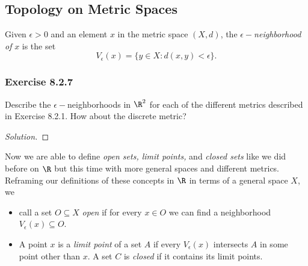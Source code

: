 \subsection{Topology on Metric Spaces}

\begin{tcolorbox}
\begin{defn}
    Given \( \epsilon > 0  \) and an element \( x  \) in the metric space \( (X,d) \), the \( \epsilon- \)\textit{neighborhood of} \( x  \)  is the set 
    \[  V_{\epsilon }(x) = \{ y \in X : d(x,y) < \epsilon \}. \]
\end{defn}
\end{tcolorbox}

\subsubsection{Exercise 8.2.7} Describe the \( \epsilon - \)neighborhoods in \( \R^{2} \) for each of the different metrics described in Exercise 8.2.1. How about the discrete metric?
\begin{proof}[Solution]

\end{proof}

Now we are able to define \textit{open sets, limit points,} and \textit{closed sets} like we did before on \( \R  \) but this time with more general spaces and different metrics. 
Reframing our definitions of these concepts in \( \R  \) in terms of a general space \( X  \), we 
\begin{itemize}
    \item call a set \( O \subseteq X  \) \textit{open} if for every \( x \in O  \) we can find a neighborhood \( V_{\epsilon }(x) \subseteq O  \). 
    \item A point \( x  \) is a \textit{limit point} of a set \( A  \) if every \( V_{\epsilon }(x)  \) intersects \( A  \) in some point other than \( x  \). A set \( C  \) is \textit{closed} if it contains its limit points.
\end{itemize}

